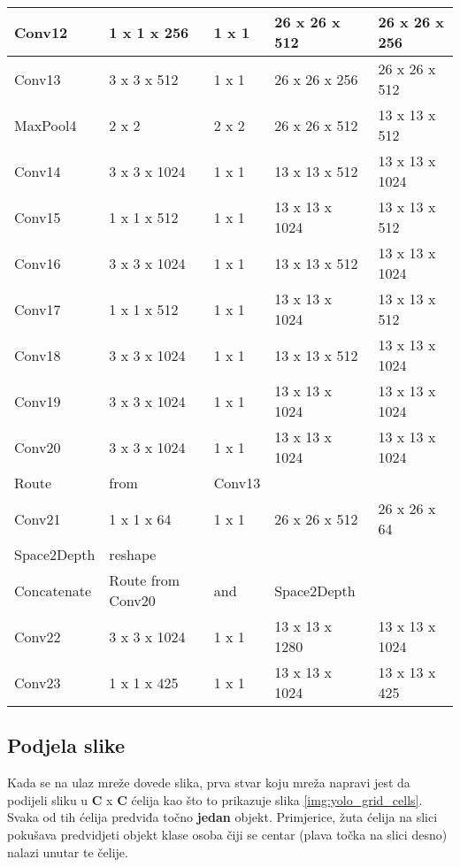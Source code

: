 \begin{minipage}{\linewidth}
\begin{tabular}{||l|l|l|l|l||}
\hline
	Conv12 & 1 x 1 x 256 & 1 x 1 & 26 x  26 x 512 & 26 x  26 x 256 \\
\hline
	Conv13 & 3 x 3 x 512 & 1 x 1 & 26 x  26 x 256 & 26 x  26 x 512 \\
\hline
	MaxPool4 & 2 x 2 & 2 x 2 & 26 x  26 x 512 & 13 x  13 x 512 \\
\hline
	Conv14 & 3 x 3 x 1024 & 1 x 1 & 13 x  13 x 512 & 13 x  13 x 1024 \\
\hline
	Conv15 & 1 x 1 x 512 & 1 x 1 & 13 x  13 x 1024 & 13 x  13 x 512 \\
\hline
	Conv16 & 3 x 3 x 1024 & 1 x 1 & 13 x  13 x 512 & 13 x  13 x 1024 \\
\hline
	Conv17 & 1 x 1 x 512 & 1 x 1 & 13 x  13 x 1024 & 13 x  13 x 512 \\
\hline
	Conv18 & 3 x 3 x 1024 & 1 x 1 & 13 x  13 x 512 & 13 x  13 x 1024 \\
\hline
	Conv19 & 3 x 3 x 1024 & 1 x 1 & 13 x  13 x 1024 & 13 x  13 x 1024 \\
\hline
	Conv20 & 3 x 3 x 1024 & 1 x 1 & 13 x  13 x 1024 & 13 x  13 x 1024 \\
\hline
\hline
	Route & from & Conv13 & & \\
\hline
	Conv21 & 1 x 1 x 64 & 1 x 1 & 26 x  26 x 512 & 26 x  26 x  64 \\
\hline
\hline
	Space2Depth & reshape & & & \\
\hline
	Concatenate & Route from Conv20 & and & Space2Depth & \\
\hline
	Conv22 & 3 x 3 x 1024 & 1 x 1 & 13 x  13 x 1280 & 13 x  13 x 1024 \\
\hline
	Conv23 & 1 x 1 x 425 & 1 x 1 & 13 x  13 x 1024 & 13 x  13 x 425 \\
\hline
\hline
\end{tabular}
 \label{tab:yolo_architecture} 
\end{minipage}

\subsection{Podjela slike}
\label{cells-section}

Kada se na ulaz mreže dovede slika, prva stvar koju mreža napravi jest da podijeli sliku u \textbf{C} x \textbf{C} ćelija kao što to prikazuje slika \ref{img:yolo_grid_cells}. Svaka od tih ćelija predviđa točno \textbf{jedan} objekt. Primjerice, žuta ćelija na slici pokušava predvidjeti objekt klase osoba čiji se centar (plava točka na slici desno) nalazi unutar te čelije.

